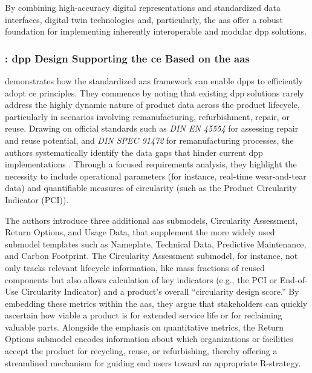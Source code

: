 By combining high-accuracy digital representations and standardized data interfaces, digital twin technologies and, particularly, the \ac{aas} offer a robust foundation for implementing inherently interoperable and modular \ac{dpp} solutions.

\subsubsection*{\textcite{Kuhn.2025}: \ac{dpp} Design Supporting the \acrlong{ce} Based on the \ac{aas}}
\textcite{Kuhn.2025} demonstrates how the standardized \ac{aas} framework can enable \ac{dpp}s to efficiently adopt \acrlong{ce} principles. They commence by noting that existing \ac{dpp} solutions rarely address the highly dynamic nature of product data across the product lifecycle, particularly in scenarios involving remanufacturing, refurbishment, repair, or reuse. Drawing on official standards such as \textit{DIN EN 45554} for assessing repair and reuse potential, and \textit{DIN SPEC 91472} for remanufacturing processes, the authors systematically identify the data gaps that hinder current \ac{dpp} implementations \autocite{DeutschesInstitutfurNormunge.V..2020, DeutschesInstitutfurNormunge.V..2023}. Through a focused requirements analysis, they highlight the necessity to include operational parameters (for instance, real-time wear-and-tear data) and quantifiable measures of circularity (such as the Product Circularity Indicator (PCI)).

The authors introduce three additional \ac{aas} submodels, Circularity Assessment, Return Options, and Usage Data, that supplement the more widely used submodel templates such as Nameplate, Technical Data, Predictive Maintenance, and Carbon Footprint. The Circularity Assessment submodel, for instance, not only tracks relevant lifecycle information, like mass fractions of reused components but also allows calculation of key indicators (e.g., the PCI or End-of-Use Circularity Indicator) and a product’s overall “circularity design score.” By embedding these metrics within the \ac{aas}, they argue that stakeholders can quickly ascertain how viable a product is for extended service life or for reclaiming valuable parts. Alongside the emphasis on quantitative metrics, the Return Options submodel encodes information about which organizations or facilities accept the product for recycling, reuse, or refurbishing, thereby offering a streamlined mechanism for guiding end users toward an appropriate R-strategy. \autocite{Kuhn.2025}

